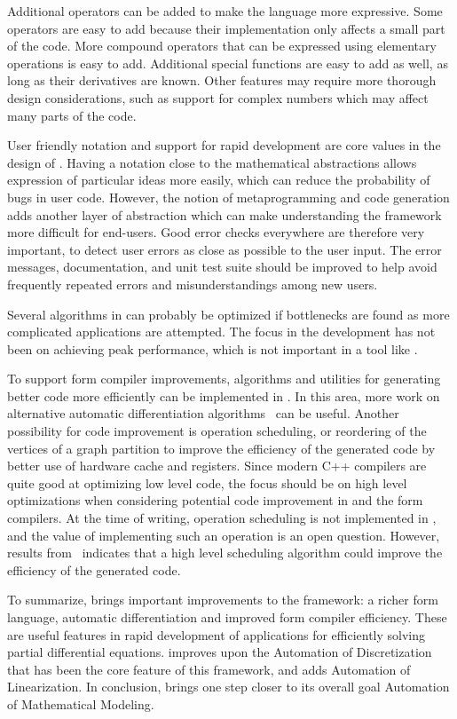 Additional operators can be added to make the language more
expressive. Some operators are easy to add because their
implementation only affects a small part of the code.  More compound
operators that can be expressed using elementary operations is easy to
add.  Additional special functions are easy to add as well, as long as
their derivatives are known.  Other features may require more thorough
design considerations, such as support for complex numbers which may
affect many parts of the code.

User friendly notation and support for rapid development are core
values in the design of \ufl{}.  Having a notation close to the
mathematical abstractions allows expression of particular ideas more
easily, which can reduce the probability of bugs in user code.
However, the notion of metaprogramming and code generation adds
another layer of abstraction which can make understanding the
framework more difficult for end-users.  Good error checks everywhere
are therefore very important, to detect user errors as close as
possible to the user input.  The error messages, documentation, and
unit test suite should be improved to help avoid frequently repeated
errors and misunderstandings among new users.

Several algorithms in \ufl{} can probably be optimized if bottlenecks
are found as more complicated applications are attempted. The focus in
the development has not been on achieving peak performance, which is
not important in a tool like \ufl{}.

To support form compiler improvements, algorithms and utilities for
generating better code more efficiently can be implemented in \ufl{}.
In this area, more work on alternative automatic differentiation
algorithms~\cite{ForTad2004,Tad2008} can be useful.  Another
possibility for code improvement is operation scheduling, or
reordering of the vertices of a graph partition to improve the
efficiency of the generated code by better use of hardware cache and
registers. Since modern C++ compilers are quite good at optimizing low
level code, the focus should be on high level optimizations when
considering potential code improvement in \ufl{} and the form
compilers.  At the time of writing, operation scheduling is not
implemented in \ufl{}, and the value of implementing such an operation
is an open question.  However, results from~\cite{ForTad2004}
indicates that a high level scheduling algorithm could improve the
efficiency of the generated code.

To summarize, \ufl{} brings important improvements to the \fenics{}
framework: a richer form language, automatic differentiation and
improved form compiler efficiency.  These are useful features in rapid
development of applications for efficiently solving partial
differential equations.
\ufl{} improves upon the Automation of Discretization
that has been the core feature of this framework,
and adds Automation of Linearization.
In conclusion, \ufl{} brings \fenics{} one step closer to
its overall goal Automation of Mathematical Modeling.

